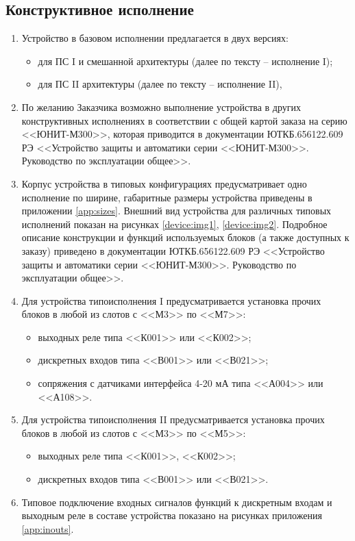 \color{unimain}\subsection{Конструктивное исполнение}
\color{black}

\begin{enumerate}

\item
Устройство в базовом исполнении предлагается в двух версиях:
\begin{itemize} 
\item для ПС I и смешанной архитектуры (далее по тексту – исполнение I); 
\item для ПС II архитектуры (далее по тексту – исполнение II), 
\end{itemize} 

\item
По желанию Заказчика возможно выполнение устройства в других конструктивных исполнениях в соответствии с общей картой заказа на серию <<ЮНИТ-М300>>, которая приводится в документации ЮТКБ.656122.609 РЭ <<Устройство защиты и автоматики серии <<ЮНИТ-М300>>. Руководство по эксплуатации общее>>.

\item
Корпус устройства в типовых конфигурациях предусматривает одно исполнение по ширине, габаритные размеры устройства приведены в приложении \ref{app:sizes}. Внешний вид устройства для различных типовых исполнений показан на рисунках \ref{device:img1}, \ref{device:img2}. Подробное описание конструкции и функций используемых блоков (а также доступных к заказу) приведено в документации ЮТКБ.656122.609 РЭ <<Устройство защиты и автоматики серии <<ЮНИТ-М300>>. Руководство по эксплуатации общее>>.

\item
Для устройства типоисполнения I предусматривается установка прочих блоков в любой из слотов с <<М3>> по <<М7>>:
\begin{itemize}
    \item выходных реле типа <<К001>> или <<К002>>;
    \item дискретных входов типа <<В001>> или <<В021>>;
    \item сопряжения с датчиками интерфейса 4-20 мА типа <<А004>> или <<А108>>.
\end{itemize}
\item
Для устройства типоисполнения II предусматривается установка прочих блоков в любой из слотов с <<М3>> по <<М5>>:
\begin{itemize}
    \item выходных реле типа <<К001>>, <<К002>>;
    \item дискретных входов типа <<В001>> или <<В021>>.
\end{itemize}
\item
Типовое подключение входных сигналов функций к дискретным входам и выходным реле в составе устройства показано на рисунках приложения \ref{app:inouts}. 


\end{enumerate}
